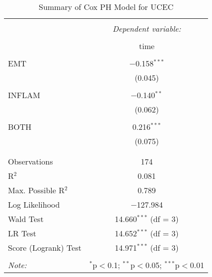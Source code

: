 
\begin{table}[!htbp] \centering 
  \caption{Summary of Cox PH Model for UCEC} 
  \label{table:UCEC_cph} 
\begin{tabular}{@{\extracolsep{5pt}}lc} 
\\[-1.8ex]\hline 
\hline \\[-1.8ex] 
 & \multicolumn{1}{c}{\textit{Dependent variable:}} \\ 
\cline{2-2} 
\\[-1.8ex] & time \\ 
\hline \\[-1.8ex] 
 EMT & $-$0.158$^{***}$ \\ 
  & (0.045) \\ 
  & \\ 
 INFLAM & $-$0.140$^{**}$ \\ 
  & (0.062) \\ 
  & \\ 
 BOTH & 0.216$^{***}$ \\ 
  & (0.075) \\ 
  & \\ 
\hline \\[-1.8ex] 
Observations & 174 \\ 
R$^{2}$ & 0.081 \\ 
Max. Possible R$^{2}$ & 0.789 \\ 
Log Likelihood & $-$127.984 \\ 
Wald Test & 14.660$^{***}$ (df = 3) \\ 
LR Test & 14.652$^{***}$ (df = 3) \\ 
Score (Logrank) Test & 14.971$^{***}$ (df = 3) \\ 
\hline 
\hline \\[-1.8ex] 
\textit{Note:}  & \multicolumn{1}{r}{$^{*}$p$<$0.1; $^{**}$p$<$0.05; $^{***}$p$<$0.01} \\ 
\end{tabular} 
\end{table} 
